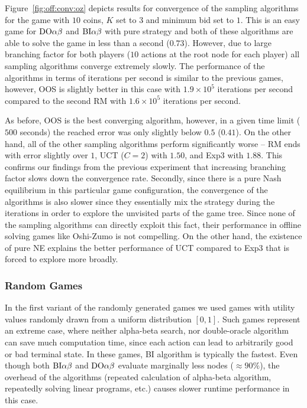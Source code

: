 Figure~\ref{fig:off:conv:oz} depicts results for convergence of the sampling algorithms for the game with $10$ coins, $K$ set to $3$ and minimum bid set to $1$. This is an easy game for $\textrm{DO}\alpha\beta$ and $\textrm{BI}\alpha\beta$ with pure strategy and both of these algorithms are able to solve the game in less than a second ($0.73$). However, due to large branching factor for both players ($10$ actions at the root node for each player) all sampling algorithms converge extremely slowly. The performance of the algorithms in terms of iterations per second is similar to the previous games, however, OOS is slightly better in this case with $1.9\times10^5$ iterations per second compared to the second RM with $1.6\times10^5$ iterations per second.

As before, OOS is the best converging algorithm, however, in a given time limit ($500$ seconds) the reached error was only slightly below $0.5$ ($0.41$). On the other hand, all of the other sampling algorithms perform significantly worse -- RM ends with error slightly over $1$, UCT ($C=2$) with $1.50$, and Exp3 with $1.88$.
This confirms our findings from the previous experiment that increasing branching factor slows down the convergence rate.
Secondly, since there is a pure Nash equilibrium in this particular game configuration, the convergence of the algorithms is also slower since they essentially mix the strategy during the iterations in order to explore the unvisited parts of the game tree. Since none of the sampling algorithms can directly exploit this fact, their performance in offline solving games like Oshi-Zumo is not compelling. On the other hand, the existence of pure NE explains the better performance of UCT compared to Exp3 that is forced to explore more broadly.

\subsubsection{Random Games}

In the first variant of the randomly generated games we used games with utility values randomly drawn from a uniform distribution $[0,1]$. 
Such games represent an extreme case, where neither alpha-beta search, nor double-oracle algorithm can save much computation time, since each action can lead to arbitrarily good or bad terminal state. 
In these games, \textsc{BI} algorithm is typically the fastest.
Even though both $\textrm{BI}\alpha\beta$ and $\textrm{DO}\alpha\beta$ evaluate marginally less nodes ($\approx90\%$), the overhead of the algorithms (repeated calculation of alpha-beta algorithm, repeatedly solving linear programs, etc.) causes slower runtime performance in this case.

